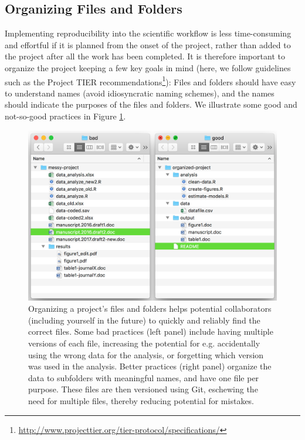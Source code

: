 \documentclass[
  american,
  ,doc,floatsintext]{apa6}
\begin{document}
\hypertarget{organizing-files-and-folders}{%
\subsection{Organizing Files and Folders}\label{organizing-files-and-folders}}

Implementing reproducibility into the scientific workflow is less time-consuming and effortful if it is planned from the onset of the project, rather than added to the project after all the work has been completed. It is therefore important to organize the project keeping a few key goals in mind (here, we follow guidelines such as the Project TIER recommendations\footnote{\url{http://www.projecttier.org/tier-protocol/specifications/}}): Files and folders should have easy to understand names (avoid idiosyncratic naming schemes), and the names should indicate the purposes of the files and folders. We illustrate some good and not-so-good practices in Figure \ref{fig:organizing-files}.

\begin{figure}

{\centering \includegraphics{images/project-organization} 

}

\caption{Organizing a project's files and folders helps potential collaborators (including yourself in the future) to quickly and reliably find the correct files. Some bad practices (left panel) include having multiple versions of each file, increasing the potential for e.g. accidentally using the wrong data for the analysis, or forgetting which version was used in the analysis. Better practices (right panel) organize the data to subfolders with meaningful names, and have one file per purpose. These files are then versioned using Git, eschewing the need for multiple files, thereby reducing potential for mistakes.}\label{fig:organizing-files}
\end{figure}
\end{document}
